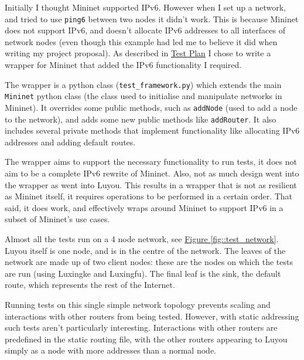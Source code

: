\documentclass[12pt,a4paper,twoside,openany]{report}
\begin{document}
Initially I thought Mininet\cite{mininet} supported IPv6.  However when I set up a network, and tried to use \verb!ping6! between two nodes it didn't work.  This is because Mininet does not support IPv6, and doesn't allocate IPv6 addresses to all interfaces of network nodes (even though this example\cite{tw_mininet} had led me to believe it did when writing my project proposal).  As described in \hyperref[sec::test_plan]{Test Plan} I chose to write a wrapper for Mininet that added the IPv6 functionality I required.  

\bigskip

The wrapper is a python class (\verb!test_framework.py!) which extends the main \verb!Mininet! python class (the class used to initialise and manipulate networks in Mininet). It overrides some public methods, such as \verb!addNode! (used to add a node to the network), and adds some new public methods like \verb!addRouter!.  It also includes several private methods that implement functionality like allocating IPv6 addresses and adding default routes.  

\bigskip

The wrapper aims to support the necessary functionality to run tests, it does not aim to be a complete IPv6 rewrite of Mininet. Also, not as much design went into the wrapper as went into Luyou. This results in a wrapper that is not as resilient as Mininet itself, it requires operations to be performed in a certain order.  That said, it does work, and effectively wraps around Mininet to support IPv6 in a subset of Mininet's use cases.

\bigskip

Almost all the tests run on a 4 node network, see \hyperref[fig::test_network]{Figure }\ref{fig::test_network}.  Luyou itself is one node, and is in the centre of the network.  The leaves of the network are made up of two client nodes: these are the nodes on which the tests are run (using Luxingke and Luxingfu).  The final leaf is the sink, the default route, which represents the rest of the Internet.  

Running tests on this single simple network topology prevents scaling and interactions with other routers from being tested. However, with static addressing such tests aren't particularly interesting. Interactions with other routers are predefined in the static routing file, with the other routers appearing to Luyou simply as a node with more addresses than a normal node.
\end{document}
